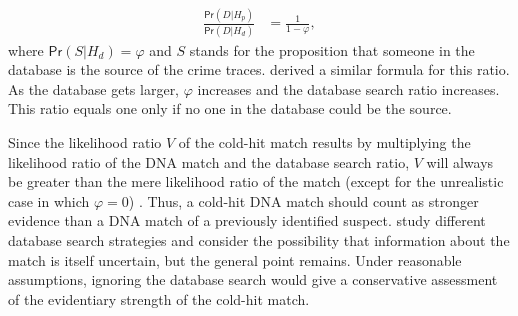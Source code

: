 \documentclass{article}
\newcommand{\pr}{\mathsf{Pr}}
\begin{document}
%
%
%
\begin{align*}
\frac{\pr(D\vert H_p)}{\pr(D\vert H_d)} & = \frac{1}{1-\varphi},
\end{align*}
%
where $\pr(S | H_d)=\varphi$ and $S$ stands for the proposition that someone in the database is the source of the crime traces. \citet{donnelly1999DNADatabaseSearches} derived a similar formula for this ratio.  As the database gets larger, $\varphi$ increases and the database search ratio increases. This ratio equals one only if no one in the database could be the source. 


Since the likelihood ratio $V$ of the cold-hit match results by multiplying the likelihood ratio of the DNA match and the database search ratio, $V$ will always be greater than the mere likelihood ratio of the match (except for the unrealistic case in which $\varphi=0$) . Thus, a cold-hit DNA match should count as stronger evidence than a DNA match of a previously identified suspect. \citet{dawid1996CoherentAnalysisForensic}  study different database search strategies and consider the possibility that information about the match is itself uncertain, but the general point remains. Under reasonable assumptions, ignoring the database search would give a conservative assessment of the evidentiary strength of the cold-hit match.
\end{document}
